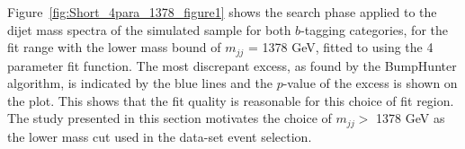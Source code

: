 Figure~\ref{fig:Short_4para_1378_figure1} shows the search phase applied to the dijet mass spectra
of the simulated sample for both $b$-tagging categories,
for the fit range with the lower mass bound of $m_{jj}$ = 1378 GeV,
fitted to using the 4 parameter fit function.
The most discrepant excess, as found by the BumpHunter algorithm, is indicated by the blue lines
and the \mbox{$p$-value} of the excess is shown on the plot.
This shows that the fit quality is reasonable for this choice of fit region.
The study presented in this section motivates the choice of $m_{jj} >$ 1378 GeV
as the lower mass cut used in the \summer{} data-set event selection.

\begin{figure}[!htb]
  \begin{center}
    \captionsetup[subfigure]{aboveskip=0pt,justification=centering}
    \\
  \end{center}

\end{figure}
